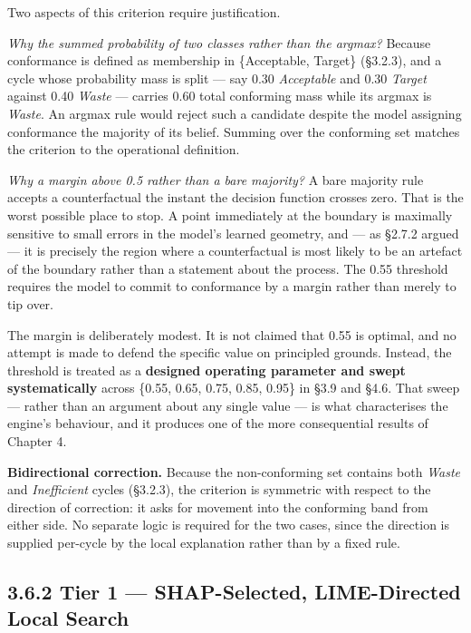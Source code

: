 Two aspects of this criterion require justification.

\emph{Why the summed probability of two classes rather than the argmax?} Because conformance is defined as membership in \{Acceptable, Target\} (§3.2.3), and a cycle whose probability mass is split --- say 0.30 \emph{Acceptable} and 0.30 \emph{Target} against 0.40 \emph{Waste} --- carries 0.60 total conforming mass while its argmax is \emph{Waste}. An argmax rule would reject such a candidate despite the model assigning conformance the majority of its belief. Summing over the conforming set matches the criterion to the operational definition.

\emph{Why a margin above 0.5 rather than a bare majority?} A bare majority rule accepts a counterfactual the instant the decision function crosses zero. That is the worst possible place to stop. A point immediately at the boundary is maximally sensitive to small errors in the model's learned geometry, and --- as §2.7.2 argued --- it is precisely the region where a counterfactual is most likely to be an artefact of the boundary rather than a statement about the process. The 0.55 threshold requires the model to commit to conformance by a margin rather than merely to tip over.

The margin is deliberately modest. It is not claimed that 0.55 is optimal, and no attempt is made to defend the specific value on principled grounds. Instead, the threshold is treated as a \textbf{designed operating parameter and swept systematically} across \{0.55, 0.65, 0.75, 0.85, 0.95\} in §3.9 and §4.6. That sweep --- rather than an argument about any single value --- is what characterises the engine's behaviour, and it produces one of the more consequential results of Chapter 4.

\textbf{Bidirectional correction.} Because the non-conforming set contains both \emph{Waste} and \emph{Inefficient} cycles (§3.2.3), the criterion is symmetric with respect to the direction of correction: it asks for movement into the conforming band from either side. No separate logic is required for the two cases, since the direction is supplied per-cycle by the local explanation rather than by a fixed rule.

\hypertarget{tier-1-shap-selected-lime-directed-local-search}{%
\subsection{3.6.2 Tier 1 --- SHAP-Selected, LIME-Directed Local Search}\label{tier-1-shap-selected-lime-directed-local-search}}

